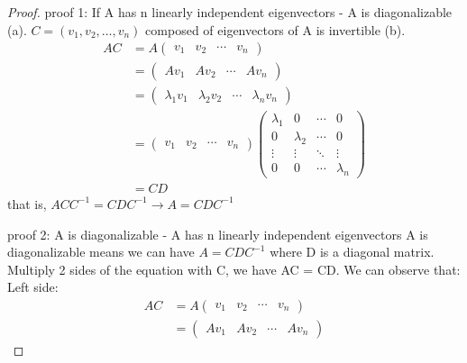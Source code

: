 \begin{proof}
   proof 1: If A has n linearly independent eigenvectors - A is diagonalizable     \newline
   (a). $C = (v_1, v_2, \dots, v_n)$ composed of eigenvectors of A is invertible \newline
   (b). 
   \begin{align*}
        AC & = A \begin{pmatrix}
                v_1 & v_2 & \cdots & v_n
                \end{pmatrix} \\
            & = \begin{pmatrix}
                Av_1 & Av_2 & \cdots & Av_n
                \end{pmatrix} \\
            & = \begin{pmatrix}
                \lambda_1v_1 & \lambda_2v_2 & \cdots & \lambda_nv_n
                \end{pmatrix} \\
            & = \begin{pmatrix}
                    v_1 & v_2 & \cdots & v_n
                \end{pmatrix}
                \begin{pmatrix}
                    \lambda_1 & 0 & \cdots & 0  \\  
                    0 & \lambda_2 & \cdots & 0 \\
                    \vdots & \vdots & \ddots & \vdots \\
                    0 & 0 & \cdots & \lambda_n 
                \end{pmatrix} \\
            & = CD
   \end{align*}
   that is, $ACC^{-1} = CDC^{-1} \rightarrow A = CDC^{-1}$

   proof 2: A is diagonalizable - A has n linearly independent eigenvectors \newline
   A is diagonalizable means we can have $A = CDC^{-1}$ where D is a diagonal matrix. Multiply 2 sides of the equation with C, we have AC = CD. We can observe that: \newline
   Left side:
   \begin{align*}
    AC & = A \begin{pmatrix}
                v_1 & v_2 & \cdots & v_n
             \end{pmatrix} \\
       & = \begin{pmatrix}
                Av_1 & Av_2 & \cdots & Av_n
            \end{pmatrix}
   \end{align*}


\end{proof}
